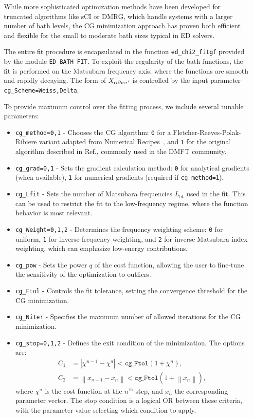 \documentclass[edipack2.tex]{subfiles}
\begin{document}
While more sophisticated optimization methods have been developed for 
truncated algorithms like sCI or DMRG, which handle systems with a 
larger number of bath levels, the CG minimization approach has proven 
both efficient and flexible for the small to moderate bath sizes 
typical in ED solvers. 

The entire fit procedure is encapsulated in the function 
\texttt{ed\_chi2\_fitgf} provided by the module 
\texttt{ED\_BATH\_FIT}. To exploit the regularity of the bath functions, 
the fit is performed on the Matsubara frequency axis, where the functions 
are smooth and rapidly decaying. The form of $X_{\alpha\beta\sigma\sigma'}$ is controlled 
by the input parameter \texttt{cg\_Scheme=Weiss,Delta}.

To provide maximum control over the fitting process, we include several 
tunable parameters:
\begin{itemize}
\item \texttt{cg\_method=0,1} - Chooses the CG algorithm: 
\texttt{0} for a Fletcher-Reeves-Polak-Ribiere variant adapted from 
Numerical Recipes~\cite{NumRec77}, and \texttt{1} for the original 
algorithm described in Ref., commonly used 
in the DMFT community.
\item \texttt{cg\_grad=0,1} - Sets the gradient calculation method: 
\texttt{0} for analytical gradients (when available), \texttt{1} for 
numerical gradients (required if \texttt{cg\_method=1}).
\item \texttt{cg\_Lfit} - Sets the number of Matsubara frequencies 
$L_\mathrm{fit}$ used in the fit. This can be used to restrict the 
fit to the low-frequency regime, where the function behavior is 
most relevant.
\item \texttt{cg\_Weight=0,1,2} - Determines the frequency weighting 
scheme: \texttt{0} for uniform, \texttt{1} for inverse frequency 
weighting, and \texttt{2} for inverse Matsubara index weighting, which 
can emphasize low-energy contributions.
\item \texttt{cg\_pow} - Sets the power $q$ of the cost function, 
allowing the user to fine-tune the sensitivity of the optimization 
to outliers.
\item \texttt{cg\_Ftol} - Controls the fit tolerance, setting the 
convergence threshold for the CG minimization.
\item \texttt{cg\_Niter} - Specifies the maximum number of allowed 
iterations for the CG minimization.
\item \texttt{cg\_stop=0,1,2} - Defines the exit condition of the 
minimization. The options are:
\begin{align*}
C_1 & = |\chi^{n-1} - \chi^n| < \mathtt{cg\_Ftol} (1+\chi^n), \\
C_2 & = \left\|x_{n-1} - x_n\right\| < 
\mathtt{cg\_Ftol} (1+\left\|x_n\right\|),
\end{align*}
where $\chi^n$ is the cost function at the $n^\mathrm{th}$ step, and 
$x_n$ the corresponding parameter vector. The stop condition is a 
logical OR between these criteria, with the parameter value selecting 
which condition to apply.
\end{itemize}
\end{document}
